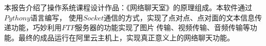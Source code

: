 \thispagestyle{empty}
\renewcommand{\baselinestretch}{1.5}  %

\begin{cnabstract}
本报告介绍了操作系统课程设计作品：《网络聊天室》的原理组成。本软件通过$Pythony$语言编写，
使用$ Socket $通信的方式，实现了点对点、点对面的文本信息传递功能，巧妙利用$ FTP $服务器的功能实现了图片
传输、视频传输、音频传输等功能。最终的成品运行在阿里云主机上，实现真正意义上的网络聊天功能。



\end{cnabstract}
\par
\vspace*{2em}

\\
